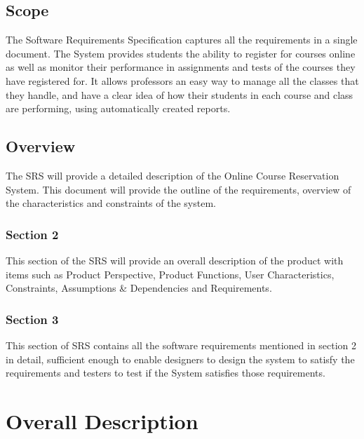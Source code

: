 \documentclass[12pt, a4]{report}
\begin{document}

\section{Scope}
The Software Requirements Specification captures all the requirements in a single document. The System provides students the ability to register for courses online as well as monitor their performance in assignments and tests of the courses they have registered for. It allows professors an easy way to manage all the classes that they handle, and have a clear idea of how their students in each course and class are performing, using automatically created reports.


\section{Overview}
The SRS will provide a detailed description of the Online Course Reservation System. This document will provide the outline of the requirements, overview of the characteristics and constraints of the system.\\
\subsection{Section 2} This section of the SRS will provide an overall description of the product with items such as Product Perspective, Product Functions, User Characteristics, Constraints, Assumptions \& Dependencies and Requirements.
\subsection{Section 3} This section of SRS contains all the software requirements mentioned in section 2 in detail, sufficient enough to enable designers to design the system to satisfy the requirements and testers to test if the System satisfies those requirements. 


\chapter{Overall Description}
\end{document}
